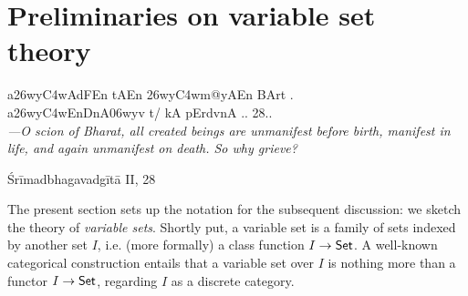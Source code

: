 \section{Preliminaries on variable set theory}\label{sec_prelim}
\epigraph
{{\dn  a\326wy\3C4wAdFEn tAEn \326wy\3C4wm@yAEn BArt . \\
			a\326wy\3C4wEnDnA\306wy\?v t/ kA pErd\?vnA .. 28..} \\[2mm]
			\footnotesize\emph{---O scion of Bharat, all created beings are unmanifest before birth, manifest in life, and again unmanifest on death. So why grieve?}}
{Śrīmadbhagavadgītā II, 28}
The present section sets up the notation for the subsequent discussion: we sketch the theory of \emph{variable sets}. Shortly put, a variable set is a family of sets indexed by another set $I$, i.e. (more formally) a class function $I \to \mathsf{Set}$. A well-known categorical construction entails that a variable set over $I$ is nothing more than a functor $I \to \mathsf{Set}$, regarding $I$ as a discrete category.


